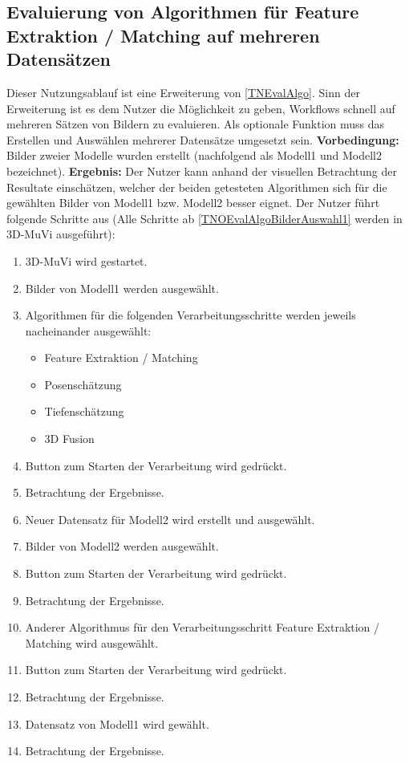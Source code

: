\subsection{Evaluierung von Algorithmen für Feature Extraktion / Matching auf mehreren Datensätzen}
Dieser Nutzungsablauf ist eine Erweiterung von \ref{TNEvalAlgo}. Sinn der Erweiterung ist es dem Nutzer die Möglichkeit zu geben, Workflows schnell auf mehreren Sätzen von Bildern zu evaluieren. Als optionale Funktion muss das Erstellen und Auswählen mehrerer Datensätze umgesetzt sein.\newline
\textbf{Vorbedingung:} Bilder zweier Modelle wurden erstellt (nachfolgend als Modell1 und Modell2 bezeichnet). \newline
\textbf{Ergebnis:} Der Nutzer kann anhand der visuellen Betrachtung der Resultate einschätzen, welcher der beiden getesteten Algorithmen sich für die gewählten Bilder von Modell1 bzw. Modell2 besser eignet. \newline
Der Nutzer führt folgende Schritte aus (Alle Schritte ab \ref{TNOEvalAlgoBilderAuswahl1} werden in 3D-MuVi ausgeführt):
\begin{enumerate}
	\item 3D-MuVi wird gestartet.
	\item \label{TNOEvalAlgoBilderAuswahl1} Bilder von Modell1 werden ausgewählt.
	\item Algorithmen für die folgenden Verarbeitungsschritte werden jeweils nacheinander ausgewählt:
	\begin{itemize}
		\item Feature Extraktion / Matching
		\item Posenschätzung
		\item Tiefenschätzung
		\item 3D Fusion
	\end{itemize}
	\item Button zum Starten der Verarbeitung wird gedrückt.
	\item Betrachtung der Ergebnisse.
	\item Neuer Datensatz für Modell2 wird erstellt und ausgewählt.
	\item Bilder von Modell2 werden ausgewählt.
	\item Button zum Starten der Verarbeitung wird gedrückt.
	\item Betrachtung der Ergebnisse.
	\item Anderer Algorithmus für den Verarbeitungsschritt Feature Extraktion / Matching wird ausgewählt.
	\item Button zum Starten der Verarbeitung wird gedrückt.
	\item Betrachtung der Ergebnisse.
	\item Datensatz von Modell1 wird gewählt.
	\item Betrachtung der Ergebnisse.
\end{enumerate}
\fi